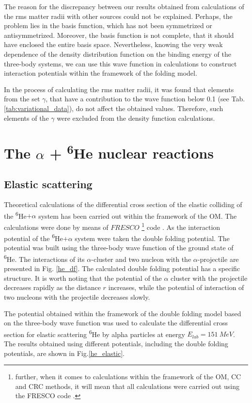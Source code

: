 \documentclass[
12pt, %
oneside, %
english, %
onehalfspacing, %
onehalfspacing, %
headsepline, %
]{MastersDoctoralThesis} %
\newcommand{\he}{\textsuperscript{6}He\xspace}
\begin{document}
The reason for the discrepancy between our results obtained from calculations of the rms matter radii with other sources could not be explained. Perhaps, the problem lies in the basis function, which has not been symmetrized or antisymmetrized. Moreover, the basis function is not complete, that it should have enclosed the entire basis space. Nevertheless, knowing the very weak dependence of the density distribution function on the binding energy of the three-body systems, we can use this wave function in calculations to construct interaction potentials within the framework of the folding model.

In the process of calculating the rms matter radii, it was found that elements from the set $\gamma$, that have a contribution to the wave function below 0.1 (see Tab.\ref{tab:variational_data}), do not affect the obtained values. Therefore, such elements of the $\gamma$ were excluded from  the density function calculations.


\section{The $\alpha$ + \he nuclear reactions }
\subsection{Elastic scattering}

Theoretical calculations of the differential cross section of the elastic colliding of the \he$ + \alpha$ system has been carried out within the framework of the OM. 
The calculations were done by means of $FRESCO$
\footnote{further, when it comes to calculations within the framework of the OM, CC and CRC methods, it will mean that all calculations were carried out using the FRESCO code \cite{fresco}.} 
code \cite{fresco}. 
As the interaction potential of the \he$ + \alpha$ system were taken the double folding potential. The potential was built using the three-body wave function of the ground state of \he. The interactions of its $\alpha$-cluster and two nucleon with the $\alpha$-projectile are presented in Fig. \ref{he_df}. The calculated double folding potential has a specific structure.
It is worth noting that the potential of the $\alpha$ cluster with the projectile decreases rapidly as the distance $r$ increases, while the potential of interaction of two nucleons with the projectile decreases slowly.

The potential obtained within the framework of the double folding model based on the three-body wave function was used to calculate the differential cross section for elastic scattering \he by alpha particles at energy $ E_{lab} = 151~MeV $. 
The results obtained using different potentials, including the double folding potentials, are shown in Fig.\ref{he_elastic}. 
\end{document}
